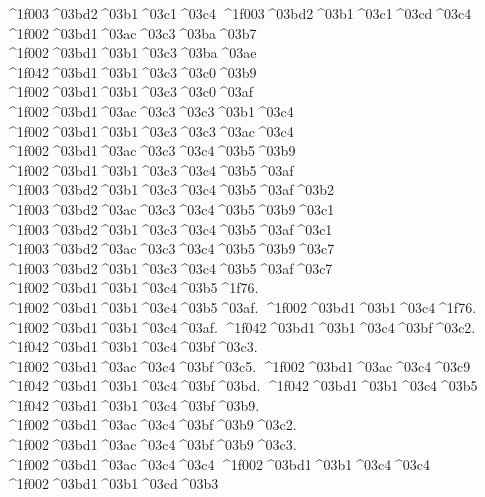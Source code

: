 {	^^^^1f003^^^^03bd2^^^^03b1^^^^03c1^^^^03c4		%
	^^^^1f003^^^^03bd2^^^^03b1^^^^03c1^^^^03cd^^^^03c4		%
^^^^1f002^^^^03bd1^^^^03ac^^^^03c3^^^^03ba^^^^03b7 		%
^^^^1f002^^^^03bd1^^^^03b1^^^^03c3^^^^03ba^^^^03ae
^^^^1f042^^^^03bd1^^^^03b1^^^^03c3^^^^03c0^^^^03b9 		%
^^^^1f002^^^^03bd1^^^^03b1^^^^03c3^^^^03c0^^^^03af
^^^^1f002^^^^03bd1^^^^03ac^^^^03c3^^^^03c3^^^^03b1^^^^03c4 		%
^^^^1f002^^^^03bd1^^^^03b1^^^^03c3^^^^03c3^^^^03ac^^^^03c4
^^^^1f002^^^^03bd1^^^^03ac^^^^03c3^^^^03c4^^^^03b5^^^^03b9 		%
^^^^1f002^^^^03bd1^^^^03b1^^^^03c3^^^^03c4^^^^03b5^^^^03af
	^^^^1f003^^^^03bd2^^^^03b1^^^^03c3^^^^03c4^^^^03b5^^^^03af^^^^03b2    	%
	^^^^1f003^^^^03bd2^^^^03ac^^^^03c3^^^^03c4^^^^03b5^^^^03b9^^^^03c1		%
	^^^^1f003^^^^03bd2^^^^03b1^^^^03c3^^^^03c4^^^^03b5^^^^03af^^^^03c1
	^^^^1f003^^^^03bd2^^^^03ac^^^^03c3^^^^03c4^^^^03b5^^^^03b9^^^^03c7		%
	^^^^1f003^^^^03bd2^^^^03b1^^^^03c3^^^^03c4^^^^03b5^^^^03af^^^^03c7
^^^^1f002^^^^03bd1^^^^03b1^^^^03c4^^^^03b5^^^^1f76. 		%
^^^^1f002^^^^03bd1^^^^03b1^^^^03c4^^^^03b5^^^^03af.
^^^^1f002^^^^03bd1^^^^03b1^^^^03c4^^^^1f76. 		%
^^^^1f002^^^^03bd1^^^^03b1^^^^03c4^^^^03af.
^^^^1f042^^^^03bd1^^^^03b1^^^^03c4^^^^03bf^^^^03c2.		%
^^^^1f042^^^^03bd1^^^^03b1^^^^03c4^^^^03bf^^^^03c3.
^^^^1f002^^^^03bd1^^^^03ac^^^^03c4^^^^03bf^^^^03c5.
^^^^1f002^^^^03bd1^^^^03ac^^^^03c4^^^^03c9
^^^^1f042^^^^03bd1^^^^03b1^^^^03c4^^^^03bf^^^^03bd.
^^^^1f042^^^^03bd1^^^^03b1^^^^03c4^^^^03b5
^^^^1f042^^^^03bd1^^^^03b1^^^^03c4^^^^03bf^^^^03b9.
^^^^1f002^^^^03bd1^^^^03ac^^^^03c4^^^^03bf^^^^03b9^^^^03c2.
^^^^1f002^^^^03bd1^^^^03ac^^^^03c4^^^^03bf^^^^03b9^^^^03c3.	
^^^^1f002^^^^03bd1^^^^03ac^^^^03c4^^^^03c4 		%
^^^^1f002^^^^03bd1^^^^03b1^^^^03c4^^^^03c4
^^^^1f002^^^^03bd1^^^^03b1^^^^03cd^^^^03b3 		%
}
